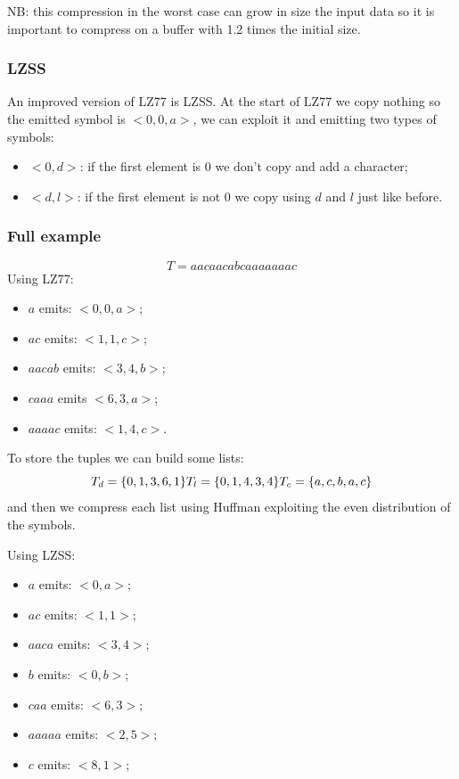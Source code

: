 NB: this compression in the worst case can grow in size the input data so it is important to compress on a buffer with 1.2 times the initial size.

\subsubsection{LZSS}
An improved version of LZ77 is LZSS.
At the start of LZ77 we copy nothing so the emitted symbol is $<0, 0, a>$, we can exploit it and emitting two types of symbols:
\begin{itemize}
    \item $<0, d>$: if the first element is 0 we don't copy and add a character;
    \item $<d, l>$: if the first element is not 0 we copy using $d$ and $l$ just like before.
\end{itemize}

\subsubsection{Full example}
$$
    T = aacaacabcaaaaaaac
$$
Using LZ77:
\begin{itemize}
    \item $a$ emits: $<0, 0, a>$;
    \item $ac$ emits: $<1, 1, c>$;
    \item $aacab$ emits: $<3, 4, b>$;
    \item $caaa$ emits $<6, 3, a>$;
    \item $aaaac$ emits: $<1, 4, c>$.
\end{itemize}
To store the tuples we can build some lists:
$$
    T_d = \{0, 1, 3, 6, 1\} \\
    T_l = \{0, 1, 4, 3, 4\} \\
    T_c = \{a, c, b, a, c\}
$$
and then we compress each list using Huffman exploiting the even distribution of the symbols.

Using LZSS:
\begin{itemize}
    \item $a$ emits: $<0, a>$;
    \item $ac$ emits: $<1, 1>$;
    \item $aaca$ emits: $<3, 4>$;
    \item $b$ emits: $<0, b>$;
    \item $caa$ emits: $<6, 3>$;
    \item $aaaaa$ emits: $<2, 5>$;
    \item $c$ emits: $<8, 1>$;
\end{itemize}

